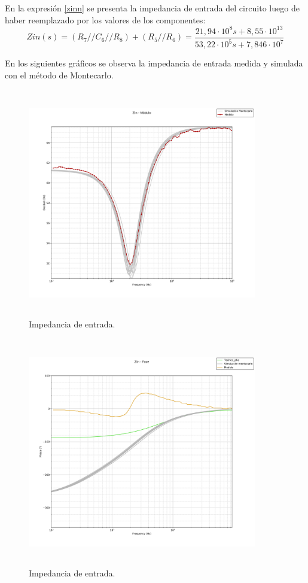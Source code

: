 En la expresi\'on \ref{zinn} se presenta la impedancia de entrada del circuito luego de haber reemplazado por los valores de los componentes:
\begin{equation}
Zin(s) =  (R_7 // C_6 // R_8)+(R_5//R_6)=\frac{21,94 \cdot 10^8 s + 8,55 \cdot 10^13}{53,22 \cdot 10^5 s + 7,846 \cdot 10^7}
\label{zinn}
\end{equation}


En los siguientes gr\'aficos se observa la impedancia de entrada medida y simulada con el m\'etodo de Montecarlo.
\begin{figure}[H] %
	\centering
	\includegraphics[width=10cm,height=10cm,keepaspectratio]{../EJ1/00GRAFICOS/zin_modulo_sinTeorico.png}
	\caption{Impedancia de entrada.}
	\label{zin_mod}
\end{figure}

\begin{figure}[H] %
	\centering
	\includegraphics[width=10cm,height=10cm,keepaspectratio]{../EJ1/00GRAFICOS/zinn.png}
	\caption{Impedancia de entrada.}
	\label{zin_fase}
\end{figure}

